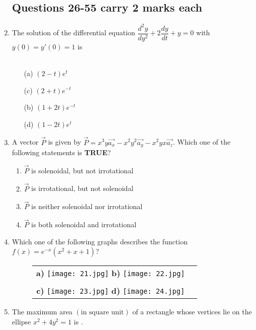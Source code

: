 \documentclass[12pt,-letter paper]{article}
\providecommand{\brak}[1]{\ensuremath{\left(#1\right)}}
\theoremstyle{remark}
\begin{document}
\begin{enumerate}
 \subsection*{Questions 26-55 carry 2 marks each}
 \item The solution of the differential equation $\dfrac{d^2y}{dy^2}+2\dfrac{dy}{dt}+y=0$ with $y\brak{0}=y'\brak{0}=1$ is\\ \\
\begin{minipage}[t]{.5\textwidth}
\begin{itemize}
    \item[(a)] $\brak{2-t}e^t$ 
    \item[(c)] $\brak{2+t}e^{-t}$
\end{itemize}
\end{minipage}
\hfill %
\begin{minipage}[t]{.5\textwidth}
\begin{itemize}
\item[(b)] $\brak{1+2t}e^{-t}$ 
\item[(d)] $\brak{1-2t}e^t$
\end{itemize}
\end{minipage}
 \item A vector $\overrightarrow{P}$ is given by $\overrightarrow{P}=x^3y\overrightarrow{a_x}-x^2y^2\overrightarrow{a_y}-x^2yx\overrightarrow{a_z}$. Which one of the following statements is \textbf{TRUE}?
 \begin{enumerate}
     \item $\overrightarrow{P}$ is solenoidal, but not irrotational
     \item $\overrightarrow{P}$ is irrotational, but not solenoidal
     \item $\overrightarrow{P}$ is neither solenoidal nor irrotational
     \item $\overrightarrow{P}$ is both solenoidal and irrotational
 \end{enumerate}
 \item Which one of the following graphs describes the function $f\brak{x}=e^{-x}\brak{x^2+x+1}$?
    \begin{figure}[H]
    \centering
    \begin{tabular}{cc}
        \textbf{a)} \texttt{[image: 21.jpg]} \hspace{3cm} %
        \textbf{b)} \texttt{[image: 22.jpg]}   \\     %
        \\ \textbf{c)} \texttt{[image: 23.jpg]} \hspace{3cm} %
        \textbf{d)} \texttt{[image: 24.jpg]}
    \end{tabular}
    \end{figure}
 \item The maximum area \brak{\text{in square unit}} of a rectangle whose vertices lie on the ellipse $x^2+4y^2=1$ is \underline{\hspace{1cm}}.


\end{enumerate}
\end{document}
